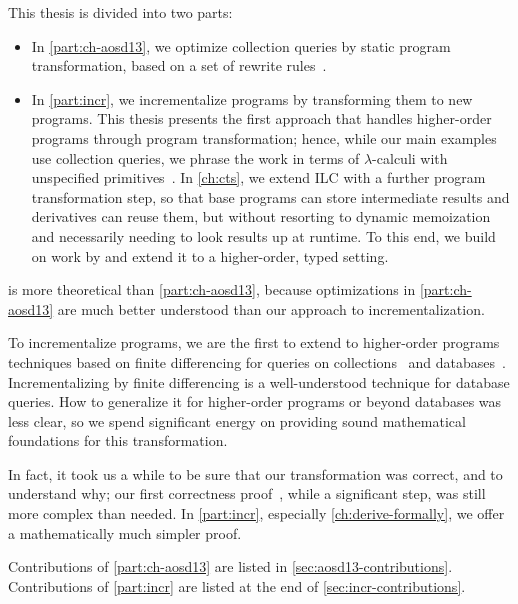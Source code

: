 This thesis is divided into two parts:
\begin{itemize}
\item In \cref{part:ch-aosd13}, we optimize collection
  queries by static program transformation, based on a set of rewrite
  rules~\citep{GiarrussoAOSD13}.
\item In \cref{part:incr}, we incrementalize programs by transforming them to
  new programs. This thesis presents the first approach that
  handles higher-order programs through program transformation; hence, while
  our main examples use collection queries, we phrase the work in terms of
  $\lambda$-calculi with unspecified primitives~\citep*{CaiEtAl2014ILC}.
  In \cref{ch:cts}, we extend ILC with a further program transformation
  step, so that base programs can store intermediate results and derivatives can
  reuse them, but without resorting to dynamic memoization and necessarily
  needing to look results up at runtime. To this end, we build on work by
  \citet{Liu00} and extend it to a higher-order, typed setting.
\end{itemize}

 is more theoretical than
\cref{part:ch-aosd13}, because optimizations in
\cref{part:ch-aosd13} are much better understood than our approach to
incrementalization.

To incrementalize programs, we are the first to extend to higher-order programs
techniques based on finite differencing for queries on
collections~\citep{Paige82FDC} and
databases~\citep{Blakeley:1986:EUM,Gupta99MMV}.
Incrementalizing by finite differencing is a well-understood technique for
database queries. How to generalize it for higher-order programs or beyond
databases was less clear, so we spend significant energy on providing sound
mathematical foundations for this transformation.

In fact, it took us a while to be sure that our transformation was correct, and
to understand why; our first correctness proof~\citep*{CaiEtAl2014ILC}, while a
significant step, was still more complex than needed. In \cref{part:incr},
especially \cref{ch:derive-formally}, we offer a mathematically much simpler
proof.

Contributions of \cref{part:ch-aosd13} are listed in \cref{sec:aosd13-contributions}.
Contributions of \cref{part:incr} are listed at the end of
\cref{sec:incr-contributions}.

